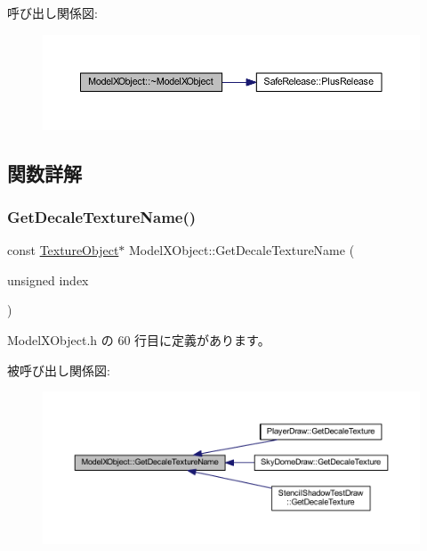 呼び出し関係図\+:\nopagebreak
\begin{figure}[H]
\begin{center}
\leavevmode
\includegraphics[width=350pt]{class_model_x_object_a33553f8ab78dfd3c9d571a048ae85324_cgraph}
\end{center}
\end{figure}


\subsection{関数詳解}
\mbox{\label{class_model_x_object_afd57d5b6b74817f4d69047640e69f14e}} 
\subsubsection{\texorpdfstring{Get\+Decale\+Texture\+Name()}{GetDecaleTextureName()}}
{\footnotesize\ttfamily const \mbox{\hyperlink{class_texture_object}{Texture\+Object}}$\ast$ Model\+X\+Object\+::\+Get\+Decale\+Texture\+Name (\begin{DoxyParamCaption}\item[{unsigned}]{index }\end{DoxyParamCaption})\hspace{0.3cm}{\ttfamily [inline]}}



 Model\+X\+Object.\+h の 60 行目に定義があります。

被呼び出し関係図\+:\nopagebreak
\begin{figure}[H]
\begin{center}
\leavevmode
\includegraphics[width=350pt]{class_model_x_object_afd57d5b6b74817f4d69047640e69f14e_icgraph}
\end{center}
\end{figure}
\mbox{\label{class_model_x_object_a27df4304e87da11e2f9c9d7a8487a985}} 
